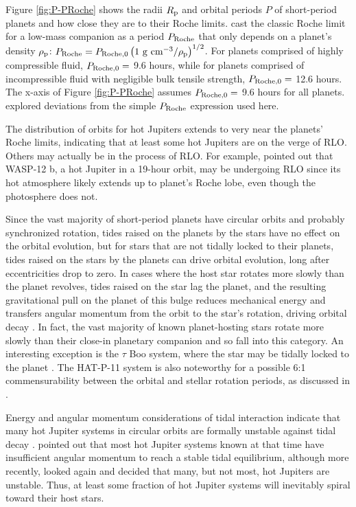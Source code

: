 \documentclass{svjour3}                     %
\begin{document}
Figure \ref{fig:P-PRoche} shows the radii $R_{\rm p}$ and orbital periods $P$ of short-period planets and how close they are to their Roche limits. \cite{Rappaport2013Roche} cast the classic Roche limit for a low-mass companion as a period $P_{\rm Roche}$ that only depends on a planet's density $\rho_{\rm p}$: $P_{\rm Roche} = P_{\rm Roche, 0} \left( 1\ {\rm g\ cm^{-3}} / \rho_{\rm p} \right)^{1/2}$. For planets comprised of highly compressible fluid, $P_{\rm Roche, 0} =$ 9.6 hours, while for planets comprised of incompressible fluid with negligible bulk tensile strength, $P_{\rm Roche, 0} =$ 12.6 hours. The x-axis of Figure \ref{fig:P-PRoche} assumes $P_{\rm Roche, 0} =$ 9.6 hours for all planets. \cite{Rappaport2013Roche} explored deviations from the simple $P_{\rm Roche}$ expression used here. 

The distribution of orbits for hot Jupiters extends to very near the planets' Roche limits, indicating that at least some hot Jupiters are on the verge of RLO. Others may actually be in the process of RLO. For example, \cite{2010Natur.463.1054L} pointed out that WASP-12 b, a hot Jupiter in a 19-hour orbit, may be undergoing RLO since its hot atmosphere likely extends up to planet's Roche lobe, even though the photosphere does not. 

Since the vast majority of short-period planets have circular orbits and probably synchronized rotation, tides raised on the planets by the stars have no effect on the orbital evolution, but for stars that are not tidally locked to their planets, tides raised on the stars by the planets can drive orbital evolution, long after eccentricities drop to zero. In cases where the host star rotates more slowly than the planet revolves, tides raised on the star lag the planet, and the resulting gravitational pull on the planet of this bulge reduces mechanical energy and transfers angular momentum from the orbit to the star's rotation, driving orbital decay \cite{2008CeMDA.101..171F}. In fact, the vast majority of known planet-hosting stars rotate more slowly than their close-in planetary companion and so fall into this category. An interesting exception is the $\tau$ Boo system, where the star may be tidally locked to the planet \cite{2008A&A...482..691W}. The HAT-P-11 system is also noteworthy for a possible 6:1 commensurability between the orbital and stellar rotation periods, as discussed in \cite{2014ApJ...788....1B}.

Energy and angular momentum considerations of tidal interaction indicate that many hot Jupiter systems in circular orbits are formally unstable against tidal decay \cite{1973ApJ...180..307C}. \cite{2009ApJ...692L...9L} pointed out that most hot Jupiter systems known at that time have insufficient angular momentum to reach a stable tidal equilibrium, although more recently, \cite{2015MNRAS.446.3676A} looked again and decided that many, but not most, hot Jupiters are unstable. Thus, at least some fraction of hot Jupiter systems will inevitably spiral toward their host stars. 
\end{document}
